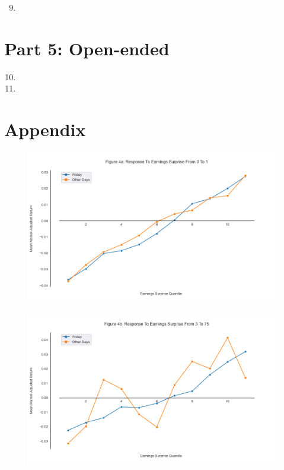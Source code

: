 \documentclass[11pt]{article}
\begin{document}
\begin{enumerate}
\setcounter{enumi}{8}
\renewcommand{\labelenumi}{(\theenumi)}
    \item 

\end{enumerate}

\section{Part 5: Open-ended}

\begin{enumerate}
\setcounter{enumi}{9}
\renewcommand{\labelenumi}{(\theenumi)}
    \item 

    \item

\end{enumerate}

\section{Appendix}
\begin{figure}[H] 
    \centering
    \includegraphics[width=.8\textwidth]{fig4a.png}
\end{figure}

\begin{figure}[H] 
    \centering
    \includegraphics[width=.8\textwidth]{fig4b.png}
\end{figure}
\end{document}
